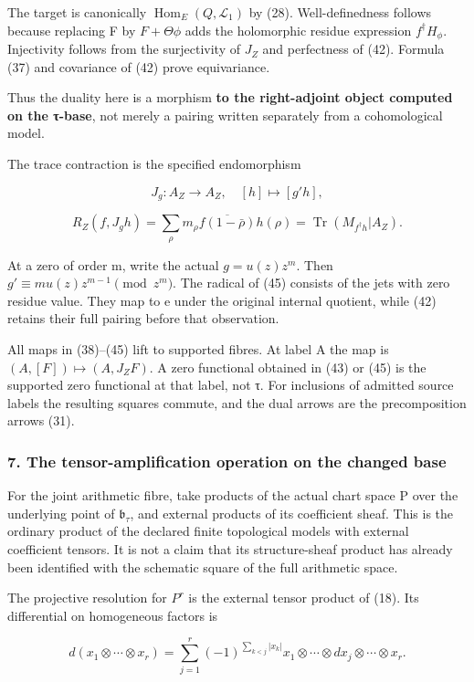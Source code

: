 The target is canonically \(\operatorname{Hom}_E(Q,\mathcal L_1)\) by (28). Well-definedness follows because replacing F by \(F+\Theta\phi\) adds the holomorphic residue expression \(f^\dagger H_\phi\). Injectivity follows from the surjectivity of \(J_Z\) and perfectness of (42). Formula (37) and covariance of (42) prove equivariance.

Thus the duality here is a morphism \textbf{to the right-adjoint object computed on the τ-base}, not merely a pairing written separately from a cohomological model.

The trace contraction is the specified endomorphism

\[
J_g:A_Z\to A_Z,\quad[h]\mapsto[g'h],
\tag{44}
\]

\[
R_Z(f,J_gh)=\sum_\rho m_\rho\overline{f(1-\bar\rho)}h(\rho)
=\operatorname{Tr}(M_{f^\dagger h}|A_Z).
\tag{45}
\]

At a zero of order m, write the actual \(g=u(z)z^m\). Then \(g'\equiv m u(z)z^{m-1}\pmod{z^m}\). The radical of (45) consists of the jets with zero residue value. They map to e under the original internal quotient, while (42) retains their full pairing before that observation.

All maps in (38)--(45) lift to supported fibres. At label A the map is \((A,[F])\mapsto(A,J_ZF)\). A zero functional obtained in (43) or (45) is the supported zero functional at that label, not τ. For inclusions of admitted source labels the resulting squares commute, and the dual arrows are the precomposition arrows (31).

\subsubsection{7. The tensor-amplification operation on the changed base}\label{endpoint-tau_base--the-tensor-amplification-operation-on-the-changed-base}

For the joint arithmetic fibre, take products of the actual chart space P over the underlying point of \(\mathfrak b_\tau\), and external products of its coefficient sheaf. This is the ordinary product of the declared finite topological models with external coefficient tensors. It is not a claim that its structure-sheaf product has already been identified with the schematic square of the full arithmetic space.

The projective resolution for \(P^r\) is the external tensor product of (18). Its differential on homogeneous factors is

\[
d(x_1\otimes\cdots\otimes x_r)=
\sum_{j=1}^r(-1)^{\sum_{k<j}|x_k|}
 x_1\otimes\cdots\otimes dx_j\otimes\cdots\otimes x_r.
\tag{46}
\]

